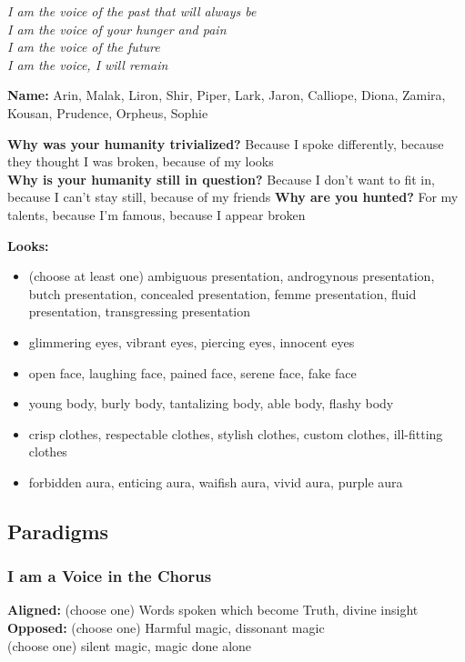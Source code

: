 \documentclass[10pt,twoside,openright]{memoir}
\begin{document}
\emph{I am the voice of the past that will always be}\\
\emph{I am the voice of your hunger and pain}\\
\emph{I am the voice of the future}\\
\emph{I am the voice, I will remain}

\textbf{Name:} Arin, Malak, Liron, Shir, Piper, Lark, Jaron, Calliope,
Diona, Zamira, Kousan, Prudence, Orpheus, Sophie

\textbf{Why was your humanity trivialized?} Because I spoke differently,
because they thought I was broken, because of my looks\\
\textbf{Why is your humanity still in question?} Because I don't want to
fit in, because I can't stay still, because of my friends \textbf{Why
are you hunted?} For my talents, because I'm famous, because I appear
broken

\textbf{Looks:}

\begin{itemize}
\tightlist
\item
  (choose at least one) ambiguous presentation, androgynous
  presentation, butch presentation, concealed presentation, femme
  presentation, fluid presentation, transgressing presentation
\item
  glimmering eyes, vibrant eyes, piercing eyes, innocent eyes
\item
  open face, laughing face, pained face, serene face, fake face
\item
  young body, burly body, tantalizing body, able body, flashy body
\item
  crisp clothes, respectable clothes, stylish clothes, custom clothes,
  ill-fitting clothes
\item
  forbidden aura, enticing aura, waifish aura, vivid aura, purple aura
\end{itemize}

\hypertarget{paradigms-7}{%
\subsection{Paradigms}\label{paradigms-7}}

\hypertarget{i-am-a-voice-in-the-chorus}{%
\subsubsection{I am a Voice in the
Chorus}\label{i-am-a-voice-in-the-chorus}}

\textbf{Aligned:} (choose one) Words spoken which become Truth, divine
insight\\
\textbf{Opposed:} (choose one) Harmful magic, dissonant magic\\
(choose one) silent magic, magic done alone
\end{document}
